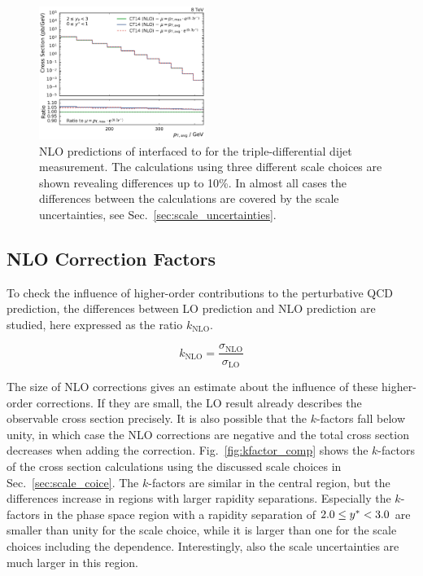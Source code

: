 \begin{figure}[htp]
    \includegraphics[width=0.48\textwidth]{figures/theory/nlo_xs_comp_yb2ys0.pdf}
    \caption[\NLOJETPP prediction of triple-differential dijet cross section]{
        NLO predictions of \fastNLO interfaced to \NLOJETPP for the
        triple-differential dijet measurement. The calculations using three
        different scale choices are shown revealing differences up to 10\%. In
        almost all cases the differences between the calculations are covered by
        the scale uncertainties, see Sec.~\ref{sec:scale_uncertainties}.}
    \label{fig:xs_nlo_comp}
\end{figure}


\subsection{NLO Correction Factors}
\label{sec:k_factors}

To check the influence of higher-order contributions to the perturbative QCD
prediction, the differences between LO prediction and NLO
prediction are studied, here expressed as the ratio $k_\mathrm{NLO}$.

\begin{equation*}
    k_{\mathrm{NLO}} = \frac{\sigma_{\mathrm{NLO}}}{\sigma_{\mathrm{LO}}}
\end{equation*}

The size of NLO corrections gives an estimate about the influence of these
higher-order corrections. If they are small, the LO result already describes the
observable cross section precisely. It is also possible that the $k$-factors
fall below unity, in which case the NLO corrections are negative and the total cross
section decreases when adding the correction.  Fig.~\ref{fig:kfactor_comp} shows
the $k$-factors of the \NLOJETPP cross section calculations using the discussed
scale choices in Sec.~\ref{sec:scale_coice}. The $k$-factors are similar in the
central region, but the differences increase in regions with larger rapidity
separations. Especially the $k$-factors in the phase space region with a
rapidity separation of $2.0 \leq y^* < 3.0$ are smaller than unity for the
\ptavg scale choice, while it is larger than one for the scale choices including
the \ystar dependence. Interestingly, also the scale uncertainties are much
larger in this region.

